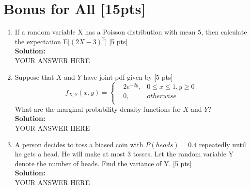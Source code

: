 \documentclass{article}
\begin{document}
\section{Bonus for All [15pts]}
\begin{enumerate}[label=(\alph*)]
\item If a random variable X has a Poisson distribution with mean 5, then calculate the expectation E[${(2X-3)^{2}}$] [5 pts]\bigskip \\
\textbf{Solution:}\\
YOUR ANSWER HERE
\newpage
\item Suppose that $X$ and $Y$ have joint pdf given by [5 pts]
$$f_{X,Y}(x,y)=\left\{
\begin{aligned}
&2e^{-2y}, & 0\leq x\leq1,y\geq0 \\
&0, & otherwise\\
\end{aligned}
\right.$$
What are the marginal probability density functions for $X$ and  $Y$?\bigskip \\
\textbf{Solution:}\\
YOUR ANSWER HERE
\newpage
\item A person decides to toss a biased coin with $P(heads)=0.4$ repeatedly until he gets a head. He will make at most 3 tosses. Let the random variable Y denote the number of heads. Find the variance of Y. [5 pts]\bigskip \\
\textbf{Solution:}\\
YOUR ANSWER HERE
\newpage
\end{enumerate}
\end{document}
